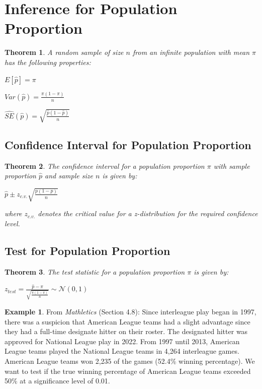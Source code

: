 \documentclass[
  11pt,
]{book}
\newtheorem{theorem}{Theorem}[chapter]
\theoremstyle{definition}
\theoremstyle{definition}
\newtheorem{example}{Example}[chapter]
\theoremstyle{definition}
\theoremstyle{definition}
\theoremstyle{remark}
\begin{document}
\newpage

\hypertarget{inference-for-population-proportion}{%
\section{Inference for Population Proportion}\label{inference-for-population-proportion}}

\begin{theorem}
A random sample of size \(n\) from an infinite population with mean \(\pi\) has the following properties:

\(E[\hat{p}] = \pi\)

\(Var(\hat{p}) = \frac{\pi(1-\pi)}{n}\)

\(\hat{SE}(\hat{p}) = \sqrt{\frac{\hat{p}(1-\hat{p})}{n}}\)
\end{theorem}

\hypertarget{confidence-interval-for-population-proportion}{%
\subsection{Confidence Interval for Population Proportion}\label{confidence-interval-for-population-proportion}}

\begin{theorem}
The confidence interval for a population proportion \(\pi\) with sample proportion \(\hat{p}\) and sample size \(n\) is given by:

\(\hat{p} \pm z_{c.v.}\sqrt{\frac{p(1-p)}{n}}\)

where \(z_{c.v.}\) denotes the critical value for a z-distribution for the required confidence level.
\end{theorem}

\hypertarget{test-for-population-proportion}{%
\subsection{Test for Population Proportion}\label{test-for-population-proportion}}

\begin{theorem}
The test statistic for a population proportion \(\pi\) is given by:

\(z_{test} = \frac{\hat{p}-\pi}{\sqrt{\frac{\pi(1-\pi)}{n}}} \sim \mathcal{N}(0,1)\)
\end{theorem}

\begin{example}
From \emph{Mathletics} (Section 4.8): Since interleague play began in 1997, there was a suspicion that American League teams had a slight advantage since they had a full-time designate hitter on their roster. The designated hitter was approved for National League play in 2022. From 1997 until 2013, American League teams played the National League teams in 4,264 interleague games. American League teams won 2,235 of the games (52.4\% winning percentage). We want to test if the true winning percentage of American League teams exceeded 50\% at a significance level of 0.01.
\end{example}
\end{document}
